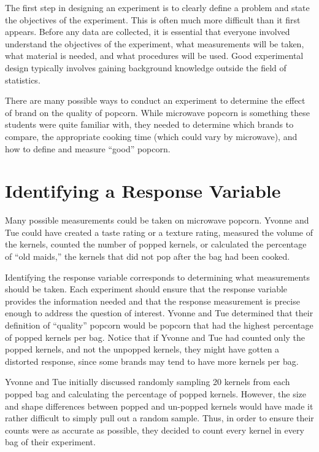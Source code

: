 \documentclass[
]{report}
\begin{document}
The first step in designing an experiment is to clearly define a problem and state the objectives of the experiment. This is often much more difficult than it first appears. Before any data are collected, it is essential that everyone involved understand the objectives of the experiment, what measurements will be taken, what material is needed, and what procedures will be used. Good experimental design typically involves gaining background knowledge outside the field of statistics.

There are many possible ways to conduct an experiment to determine the effect of brand on the quality of popcorn. While microwave popcorn is something these students were quite familiar with, they needed to determine which brands to compare, the appropriate cooking time (which could vary by microwave), and how to define and measure ``good'' popcorn.

\hypertarget{identifying-a-response-variable}{%
\section*{Identifying a Response Variable}\label{identifying-a-response-variable}}

Many possible measurements could be taken on microwave popcorn. Yvonne and Tue could have created a taste rating or a texture rating, measured the volume of the kernels, counted the number of popped kernels, or calculated the percentage of ``old maids,'' the kernels that did not pop after the bag had been cooked.

Identifying the response variable corresponds to determining what measurements should be taken. Each experiment should ensure that the response variable provides the information needed and that the response measurement is precise enough to address the question of interest. Yvonne and Tue determined that their definition of ``quality'' popcorn would be popcorn that had the highest percentage of popped kernels per bag. Notice that if Yvonne and Tue had counted only the popped kernels, and not the unpopped kernels, they might have gotten a distorted response, since some brands may tend to have more kernels per bag.

Yvonne and Tue initially discussed randomly sampling 20 kernels from each popped bag and calculating the percentage of popped kernels. However, the size and shape differences between popped and un-popped kernels would have made it rather difficult to simply pull out a random sample. Thus, in order to ensure their counts were as accurate as possible, they decided to count every kernel in every bag of their experiment.
\end{document}
